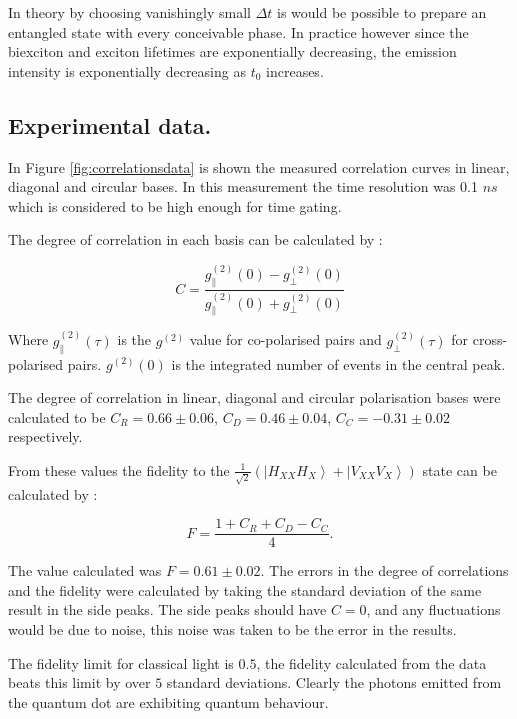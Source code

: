 \documentclass[12pt, twoside]{article}
\numberwithin{equation}{section}
\begin{document}
In theory by choosing vanishingly small $\Delta t$ is would be possible
to prepare an entangled state with every conceivable phase. In practice
however since the biexciton and exciton lifetimes are exponentially
decreasing, the emission intensity is exponentially decreasing as $t_0$
increases.

\subsection{Experimental data.}\label{experimental-data.}

In Figure \ref{fig:correlationsdata} is shown the measured correlation
curves in linear, diagonal and circular bases. In this measurement the
time resolution was 0.1 $ns$ which is considered to be high enough for
time gating.

The degree of correlation in each basis can be calculated by
\cite{entandiode}:

\begin{equation}
C = \frac{ g^{(2)}_{\parallel}(0) - g^{(2)}_{\perp}(0) }{ g^{(2)}_{\parallel}(0) + g^{(2)}_{\perp}(0) }
\end{equation}

Where $g^{(2)}_{\parallel}(\tau)$ is the $g^{(2)}$ value for
co-polarised pairs and $g^{(2)}_{\perp}(\tau)$ for cross-polarised
pairs. $g^{(2)}(0)$ is the integrated number of events in the central
peak.

The degree of correlation in linear, diagonal and circular polarisation
bases were calculated to be $C_R = 0.66 \pm 0.06$,
$C_D = 0.46 \pm 0.04$, $C_C = -0.31 \pm 0.02$ respectively.

From these values the fidelity to the
$\frac{1}{\sqrt{2}}  \left(\left|H_{XX} H_X\right\rangle + \left|V_{XX} V_X\right\rangle \right)$
state can be calculated by :

\begin{equation}
F = \frac{1 + C_R + C_D - C_C}{4}.
\end{equation}

The value calculated was $F = 0.61 \pm 0.02$. The errors in the degree
of correlations and the fidelity were calculated by taking the standard
deviation of the same result in the side peaks. The side peaks should
have $C = 0$, and any fluctuations would be due to noise, this noise was
taken to be the error in the results.

The fidelity limit for classical light is $0.5$, the fidelity calculated
from the data beats this limit by over $5$ standard deviations. Clearly
the photons emitted from the quantum dot are exhibiting quantum
behaviour.
\end{document}
